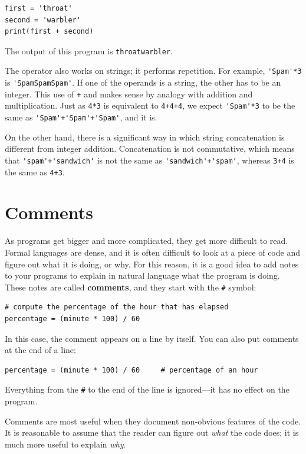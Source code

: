 \beforeverb
\begin{verbatim}
first = 'throat'
second = 'warbler'
print(first + second)
\end{verbatim}
\afterverb
%
The output of this program is {\tt throatwarbler}.

The {\tt *} operator also works on strings; it performs repetition.
For example, \verb"'Spam'*3" is \verb"'SpamSpamSpam'".  If one of the operands
is a string, the other has to be an integer.
This use of {\tt +} and {\tt *} makes sense by
analogy with addition and multiplication.  Just as {\tt 4*3} is
equivalent to {\tt 4+4+4}, we expect \verb"'Spam'*3" to be the same as
\verb"'Spam'+'Spam'+'Spam'", and it is.  

On the other hand, there is a significant way in which string concatenation 
is different from integer addition. Concatenation is not commutative, which
 means that \verb"'spam'+'sandwich'" is not the same as \verb"'sandwich'+'spam'",
 whereas {\tt 3+4} is the same as {\tt 4+3}.



\section{Comments}

As programs get bigger and more complicated, they get more difficult
to read.  Formal languages are dense, and it is often difficult to
look at a piece of code and figure out what it is doing, or why.
For this reason, it is a good idea to add notes to your programs to explain
in natural language what the program is doing.  These notes are called
{\bf comments}, and they start with the \verb"#" symbol:

\beforeverb
\begin{verbatim}
# compute the percentage of the hour that has elapsed
percentage = (minute * 100) / 60
\end{verbatim}
\afterverb
%
In this case, the comment appears on a line by itself.  You can also put
comments at the end of a line:

\beforeverb
\begin{verbatim}
percentage = (minute * 100) / 60     # percentage of an hour
\end{verbatim}
\afterverb
%
Everything from the {\tt \#} to the end of the line is ignored---it
has no effect on the program.

Comments are most useful when they document non-obvious features of
the code.  It is reasonable to assume that the reader can figure out
{\em what} the code does; it is much more useful to explain {\em why}.

